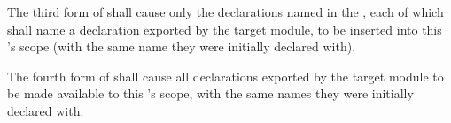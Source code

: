 \specsubitem
The third form of  shall cause only the declarations
named in the , each of which shall name a declaration
exported by the target module, to be inserted into this 's
scope (with the same name they were initially declared with).


\specsubitem
The fourth form of  shall cause all declarations
exported by the target module to be made available to this
's scope, with the same names they were initially declared
with.
